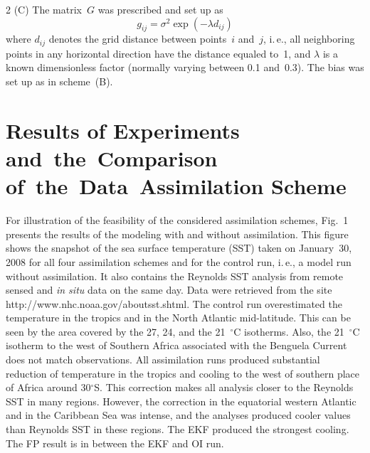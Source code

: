 \begin{multicols}{2}
(C) The matrix~$G$ was prescribed and set up as
$$
g_{ij} =\sigma ^{2} \exp (-\lambda d_{ij} )$$ 
where $d_{ij} $ denotes the grid distance between points~$i$  and~$j$, i.\,e., 
all neighboring points in any horizontal direction have the distance equaled to~1, and  
$\lambda $ is a known dimensionless factor (normally varying between 0.1 and~0.3). 
The bias was set up as in scheme~(B).

\section{Results of Experiments and~the~Comparison of~the~Data~Assimilation Scheme} 

\noindent
For illustration of the feasibility of the considered assimilation schemes, Fig.~1 
presents the results of the modeling with and without assimilation. This figure 
shows the snapshot of the sea surface temperature (SST) taken on January~30, 2008 
for all four assimilation schemes and for the control run, i.\,e., a model run without 
assimilation. It also contains the Reynolds SST analysis from remote sensed and \textit{in situ} 
data on the same day. Data were retrieved from the site {\sf http://www.nhc.noaa.gov/aboutsst.shtml}. 
The control run overestimated the temperature in the tropics and in the North Atlantic mid-latitude. 
This can be seen by the area covered by the 27, 24, and the 21~$^\circ$C isotherms. 
Also, the 21~$^\circ$C isotherm to the west of Southern Africa associated with the Benguela 
Current does not match observations. All assimilation runs produced substantial reduction 
of temperature in the tropics and cooling to the west of southern place of Africa 
around 30$^\circ$S. This correction makes all analysis closer to the Reynolds 
SST in many regions. However, the correction in the equatorial western Atlantic 
and in the Caribbean Sea was intense, and the analyses produced cooler values 
than Reynolds SST in these regions. The EKF produced the strongest cooling. The FP 
result is in between the EKF and OI run.

\begin{figure} %
\vspace*{1pt}
 \begin{center}
 \mbox{%
 \epsfxsize=140.719mm
 }
 \end{center}
 \vspace*{-9pt}
\end{figure}




\end{multicols}
